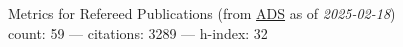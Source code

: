 Metrics for Refereed Publications (from \href{\adsurl}{ADS} as of \textit{2025-02-18}) \\count: 59 --- citations: 3289 --- h-index: 32